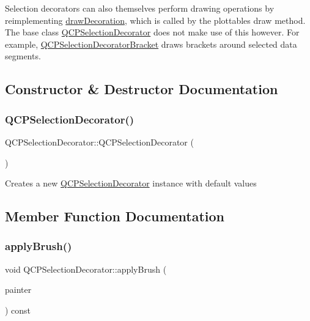 Selection decorators can also themselves perform drawing operations by reimplementing \hyperlink{class_q_c_p_selection_decorator_a4f8eb49e277063845391e803ae23054a}{draw\+Decoration}, which is called by the plottable\textquotesingle{}s draw method. The base class \hyperlink{class_q_c_p_selection_decorator}{Q\+C\+P\+Selection\+Decorator} does not make use of this however. For example, \hyperlink{class_q_c_p_selection_decorator_bracket}{Q\+C\+P\+Selection\+Decorator\+Bracket} draws brackets around selected data segments. 

\subsection{Constructor \& Destructor Documentation}
\mbox{\label{class_q_c_p_selection_decorator_aa145480d9a062cd176fe30900bb7bca8}} 
\subsubsection{\texorpdfstring{Q\+C\+P\+Selection\+Decorator()}{QCPSelectionDecorator()}}
{\footnotesize\ttfamily Q\+C\+P\+Selection\+Decorator\+::\+Q\+C\+P\+Selection\+Decorator (\begin{DoxyParamCaption}{ }\end{DoxyParamCaption})}

Creates a new \hyperlink{class_q_c_p_selection_decorator}{Q\+C\+P\+Selection\+Decorator} instance with default values 

\subsection{Member Function Documentation}
\mbox{\label{class_q_c_p_selection_decorator_a225544527d51b49546b70d0e6d655a34}} 
\subsubsection{\texorpdfstring{apply\+Brush()}{applyBrush()}}
{\footnotesize\ttfamily void Q\+C\+P\+Selection\+Decorator\+::apply\+Brush (\begin{DoxyParamCaption}\item[{\hyperlink{class_q_c_p_painter}{Q\+C\+P\+Painter} $\ast$}]{painter }\end{DoxyParamCaption}) const}

